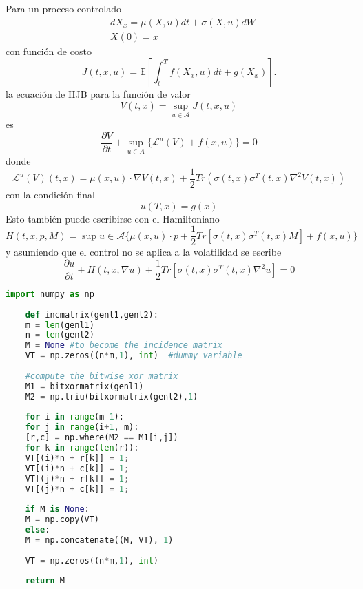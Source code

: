 \documentclass{article}
\newcommand{\dpartial}[2]{\frac{\partial #1}{\partial #2}}
\newenvironment{recordar}[1][Recordar]
{\begin{tcolorbox}[breakable,colback=red!10!white,colframe=red!50!blue,title=Recordar: #1 ,enhanced jigsaw]
	
}{\end{tcolorbox}}
\begin{document}
\begin{recordar}[Hamilton-Jacobi-Bellman]
	Para un proceso controlado
	\begin{equation*}
		\begin{split}
			&dX_x=\mu(X,u)dt+\sigma(X,u)dW\\
			&X(0)=x
		\end{split}
	\end{equation*}
con función de costo
\begin{equation*}
	J(t,x,u)=\mathbb{E}\left[\int_{t}^{T}f(X_x,u) dt +g(X_x)\right].
\end{equation*}
la ecuación de HJB para la función de valor
\begin{equation*}
	V(t,x)=\sup_{u\in \mathcal{A}}J(t,x,u)
\end{equation*}
es
\begin{equation*}
	\dpartial{V}{t}+\sup_{u\in A}\{ \mathcal{L}^{u}(V)+f(x,u)\}=0
\end{equation*}
donde 
\begin{equation*}
	\mathcal{L}^{u}(V)(t,x)=\mu(x,u)\cdot \nabla V(t,x) +\frac{1}{2}Tr(\sigma(t,x)\sigma^{T}(t,x)\nabla^2 V(t,x))
\end{equation*}
con la condición final
\begin{equation*}
	u(T,x)=g(x)
\end{equation*}
Esto también puede escribirse con el Hamiltoniano
	\begin{equation*}
		H(t,x,p,M)=\sup{u\in \mathcal{A}}\{\mu(x,u)\cdot p+\frac{1}{2}Tr[\sigma(t,x)\sigma^{T}(t,x)M]+f(x,u)\}
	\end{equation*}
y asumiendo que el control no se aplica a la volatilidad se escribe
\begin{equation*}
	\dpartial{u}{t}+H(t,x,\nabla u)+\frac{1}{2}Tr[\sigma(t,x)\sigma^{T}(t,x)\nabla^2 u]=0
\end{equation*}

\end{recordar}


\begin{lstlisting}[language=Python]
	import numpy as np
	
	def incmatrix(genl1,genl2):
	m = len(genl1)
	n = len(genl2)
	M = None #to become the incidence matrix
	VT = np.zeros((n*m,1), int)  #dummy variable
	
	#compute the bitwise xor matrix
	M1 = bitxormatrix(genl1)
	M2 = np.triu(bitxormatrix(genl2),1) 
	
	for i in range(m-1):
	for j in range(i+1, m):
	[r,c] = np.where(M2 == M1[i,j])
	for k in range(len(r)):
	VT[(i)*n + r[k]] = 1;
	VT[(i)*n + c[k]] = 1;
	VT[(j)*n + r[k]] = 1;
	VT[(j)*n + c[k]] = 1;
	
	if M is None:
	M = np.copy(VT)
	else:
	M = np.concatenate((M, VT), 1)
	
	VT = np.zeros((n*m,1), int)
	
	return M
\end{lstlisting}
\end{document}
